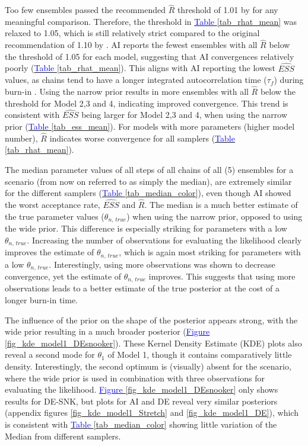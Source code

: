 Too few ensembles passed the recommended $\hat{R}$ threshold of 1.01 by \cite{vehtari2021rank} for any meaningful comparison. Therefore, the threshold in \hyperref[tab_rhat_mean]{\textcolor{blue}{Table }\ref{tab_rhat_mean}} was relaxed to 1.05, which is still relatively strict compared to the original recommendation of 1.10 by \cite{gelman1992inference}. AI reports the fewest ensembles with all $\hat{R}$ below the threshold of 1.05 for each model, suggesting that AI convergences relatively poorly (\hyperref[tab_rhat_mean]{\textcolor{blue}{Table }\ref{tab_rhat_mean}}). This aligns with AI reporting the lowest $\widehat{ESS}$ values, as chains tend to have a longer integrated autocorrelation time ($\tau_f$) during burn-in \citep{hogg2018data}. Using the narrow prior results in more ensembles with all $\hat{R}$ below the threshold for Model 2,3 and 4, indicating improved convergence. This trend is consistent with $\widehat{ESS}$ being larger for Model 2,3 and 4, when using the narrow prior (\hyperref[tab_ess_mean]{\textcolor{blue}{Table }\ref{tab_ess_mean}}). For models with more parameters (higher model number), $\hat{R}$ indicates worse convergence for all samplers (\hyperref[tab_rhat_mean]{\textcolor{blue}{Table }\ref{tab_rhat_mean}}).

The median parameter values of all steps of all chains of all (5) ensembles for a scenario (from now on referred to as simply the median), are extremely similar for the different samplers  (\hyperref[tab_median_color]{\textcolor{blue}{Table }\ref{tab_median_color}}), even though AI showed the worst acceptance rate, $\widehat{ESS}$ and $\hat{R}$. The median is a much better estimate of the true parameter values ($\theta_{n,\,true}$) when using the narrow prior, opposed to using the wide prior. This difference is especially striking for parameters with a low $\theta_{n,\,true}$. Increasing the number of observations for evaluating the likelihood clearly improves the estimate of $\theta_{n,\,true}$, which is again most striking for parameters with a low $\theta_{n,\,true}$. Interestingly, using more observations was shown to decrease convergence, yet the estimate of $\theta_{n,\,true}$ improves. This suggests that using more observations leads to a better estimate of the true posterior at the cost of a longer burn-in time. 

The influence of the prior on the shape of the posterior appears strong, with the wide prior resulting in a much broader posterior (\hyperref[fig_kde_model1_DEsnooker]{\textcolor{blue}{Figure }\ref{fig_kde_model1_DEsnooker}}). These Kernel Density Estimate (KDE) plots also reveal a second mode for $\theta_1$ of Model 1, though it contains comparatively little density. Interestingly, the second optimum is (visually) absent for the scenario, where the wide prior is used in combination with three observations for evaluating the likelihood.  \hyperref[fig_kde_model1_DEsnooker]{\textcolor{blue}{Figure }\ref{fig_kde_model1_DEsnooker}} only shows results for DE-SNK, but plots for AI and DE reveal very similar posteriors (appendix figures \ref{fig_kde_model1_Stretch} and \ref{fig_kde_model1_DE}), which is consistent with \hyperref[tab_median_color]{\textcolor{blue}{Table }\ref{tab_median_color}} showing little variation of the Median from different samplers.  

